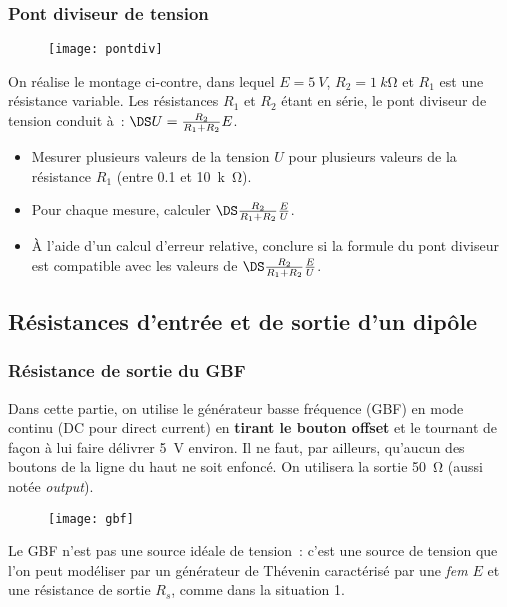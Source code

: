 \documentclass[../main/main.tex]{subfiles}
\begin{document}
\subsubsection{Pont diviseur de tension}
\begin{wrapfigure}[5]{R}{.2\linewidth}
	\centering
	\texttt{[image: pontdiv]}
\end{wrapfigure}

On réalise le montage ci-contre, dans lequel $E = \SI{5}{V}$, $R_2 =
	\SI{1}{k\ohm}$ et $R_1$ est une résistance variable. Les résistances $R_1$ et
$R_2$ étant en série, le pont diviseur de tension conduit à : $\DS U =
	\frac{R_2}{R_1+R_2}E$.

\begin{itemize}
	\item Mesurer plusieurs valeurs de la tension $U$ pour plusieurs valeurs de
	      la résistance $R_1$ (entre \num{0.1} et \SI{10}{k\ohm}).
	\item Pour chaque mesure, calculer $\DS \frac{R_2}{R_1+R_2} \frac{E}{U}$.
	\item À l’aide d’un calcul d’erreur relative, conclure si la formule du pont
	      diviseur est compatible avec les valeurs de $\DS \frac{R_2}{R_1+R_2}
		      \frac{E}{U}$.
\end{itemize}

\subsection{Résistances d'entrée et de sortie d'un dipôle}
\subsubsection{Résistance de sortie du GBF}

Dans cette partie, on utilise le générateur basse fréquence (GBF) en mode
continu (DC pour direct current) en \textbf{tirant le bouton offset} et le
tournant de façon à lui faire délivrer \SI{5}{V} environ. Il ne faut, par
ailleurs, qu’aucun des boutons de la ligne du haut ne soit enfoncé. On utilisera
la sortie \SI{50}{\ohm} (aussi notée \textit{output}).\bigbreak

\begin{wrapfigure}[11]{R}{.45\linewidth}
	\centering
	\texttt{[image: gbf]}
\end{wrapfigure}
Le GBF n’est pas une source idéale de tension~: c’est une source de tension que
l’on peut modéliser par un générateur de Thévenin caractérisé par une
\textit{fem} $E$ et une résistance de sortie $R_s$, comme dans la situation 1.
\end{document}
